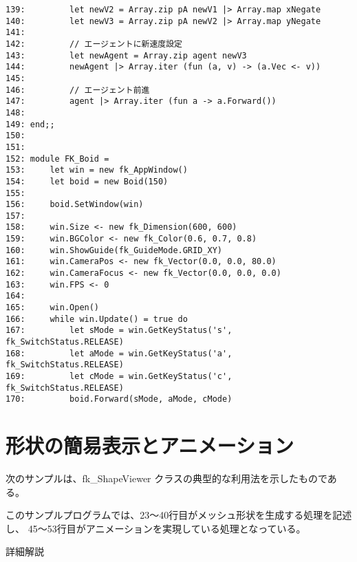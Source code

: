 \begin{breakbox}
\begin{small}
\begin{verbatim}
139:         let newV2 = Array.zip pA newV1 |> Array.map xNegate
140:         let newV3 = Array.zip pA newV2 |> Array.map yNegate
141: 
142:         // エージェントに新速度設定
143:         let newAgent = Array.zip agent newV3
144:         newAgent |> Array.iter (fun (a, v) -> (a.Vec <- v))
145: 
146:         // エージェント前進
147:         agent |> Array.iter (fun a -> a.Forward())
148: 
149: end;;
150: 
151: 
152: module FK_Boid =
153:     let win = new fk_AppWindow()
154:     let boid = new Boid(150)
155: 
156:     boid.SetWindow(win)
157: 
158:     win.Size <- new fk_Dimension(600, 600)
159:     win.BGColor <- new fk_Color(0.6, 0.7, 0.8)
160:     win.ShowGuide(fk_GuideMode.GRID_XY)
161:     win.CameraPos <- new fk_Vector(0.0, 0.0, 80.0)
162:     win.CameraFocus <- new fk_Vector(0.0, 0.0, 0.0)
163:     win.FPS <- 0
164: 
165:     win.Open()
166:     while win.Update() = true do
167:         let sMode = win.GetKeyStatus('s', fk_SwitchStatus.RELEASE)
168:         let aMode = win.GetKeyStatus('a', fk_SwitchStatus.RELEASE)
169:         let cMode = win.GetKeyStatus('c', fk_SwitchStatus.RELEASE)
170:         boid.Forward(sMode, aMode, cMode)
\end{verbatim}
\end{small}
\end{breakbox}

\section{形状の簡易表示とアニメーション} \label{sec:sampleviewer}

次のサンプルは、fk\_ShapeViewer クラスの典型的な利用法を示したものである。

このサンプルプログラムでは、23〜40行目がメッシュ形状を生成する処理を記述し、
45〜53行目がアニメーションを実現している処理となっている。


\begin{center}
詳細解説
\end{center}

